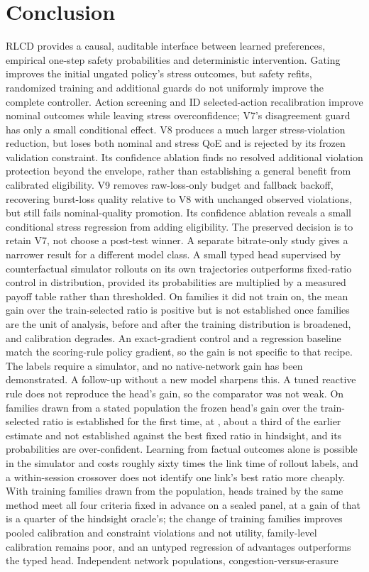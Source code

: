 \documentclass[10pt]{article}
\providecommand{\NOneConclusionSentence}{}
\begin{document}
\section{Conclusion}
RLCD provides a causal, auditable interface between learned preferences, empirical one-step safety probabilities and deterministic intervention. Gating improves the initial ungated policy's stress outcomes, but safety refits, randomized training and additional guards do not uniformly improve the complete controller. Action screening and ID selected-action recalibration improve nominal outcomes while leaving stress overconfidence; V7's disagreement guard has only a small conditional effect. V8 produces a much larger stress-violation reduction, but loses both nominal and stress QoE and is rejected by its frozen validation constraint. Its confidence ablation finds no resolved additional violation protection beyond the envelope, rather than establishing a general benefit from calibrated eligibility. V9 removes raw-loss-only budget and fallback backoff, recovering burst-loss quality relative to V8 with unchanged observed violations, but still fails nominal-quality promotion. Its confidence ablation reveals a small conditional stress regression from adding eligibility. The preserved decision is to retain V7, not choose a post-test winner. A separate bitrate-only study gives a narrower result for a different model class. A small typed head supervised by counterfactual simulator rollouts on its own trajectories outperforms fixed-ratio control in distribution, provided its probabilities are multiplied by a measured payoff table rather than thresholded. On families it did not train on, the mean gain over the train-selected ratio is positive but is not established once families are the unit of analysis, before and after the training distribution is broadened, and calibration degrades. An exact-gradient control and a regression baseline match the scoring-rule policy gradient, so the gain is not specific to that recipe. The labels require a simulator, and no native-network gain has been demonstrated. A follow-up without a new model sharpens this. A tuned reactive rule does not reproduce the head's gain, so the comparator was not weak. On \TypedRepFamilies{} families drawn from a stated population the frozen head's gain over the train-selected ratio is established for the first time, at \TypedRepGain{}, about a third of the earlier estimate and not established against the best fixed ratio in hindsight, and its probabilities are over-confident. Learning from factual outcomes alone is possible in the simulator and costs roughly sixty times the link time of rollout labels, and a within-session crossover does not identify one link's best ratio more cheaply. With training families drawn from the population, heads trained by the same method meet all four criteria fixed in advance on a sealed panel, at a gain of \TypedPopGain{} that is a quarter of the hindsight oracle's; the change of training families improves pooled calibration and constraint violations and not utility, family-level calibration remains poor, and an untyped regression of advantages outperforms the typed head.\NOneConclusionSentence{} Independent network populations, congestion-versus-erasure 
\end{document}
